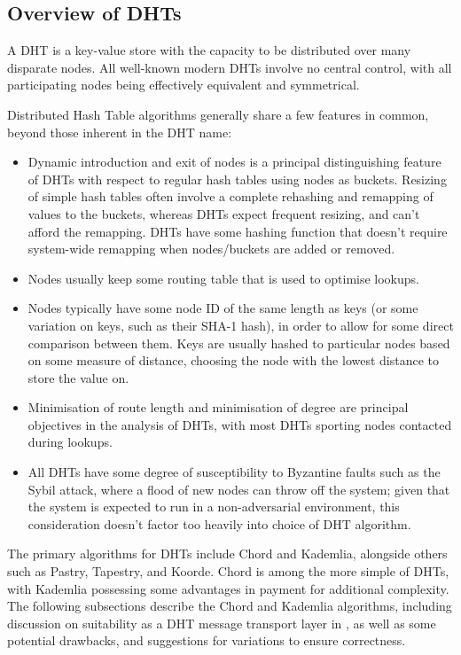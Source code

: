 \subsection{Overview of DHTs}

A DHT is a key-value store with the capacity to be distributed over many disparate nodes\cite{balakrishnan2003p2p}.
All well-known modern DHTs involve no central control, with all participating nodes being effectively equivalent and symmetrical.

Distributed Hash Table algorithms generally share a few features in common, beyond those inherent in the DHT name: \begin{itemize} \item Dynamic introduction and exit of nodes is a principal distinguishing feature of DHTs with respect to regular hash tables using nodes as buckets.
	      Resizing of simple hash tables often involve a complete rehashing and remapping of values to the buckets, whereas DHTs expect frequent resizing, and can't afford the remapping.
	      DHTs have some hashing function that doesn't require system-wide remapping when nodes/buckets are added or removed\cite{thaler1996rendezvous}.
	\item Nodes usually keep some routing table that is used to optimise lookups\cite{galuba2009p2p}.
	\item Nodes typically have some node ID of the same length as keys (or some variation on keys, such as their SHA-1 hash), in order to allow for some direct comparison between them.
	      Keys are usually hashed to particular nodes based on some measure of distance, choosing the node with the lowest distance to store the value on.
	\item Minimisation of route length and minimisation of degree are principal objectives in the analysis of DHTs, with most DHTs sporting  nodes contacted during lookups.
	\item All DHTs have some degree of susceptibility to Byzantine faults such as the Sybil attack, where a flood of new nodes can throw off the system; given that the \lsr{} system is expected to run in a non-adversarial environment, this consideration doesn't factor too heavily into choice of DHT algorithm\cite{douceur2002sybil}\cite{urdaneta2011dhtsec}.
\end{itemize}

The primary algorithms for DHTs include Chord and Kademlia, alongside others such as Pastry, Tapestry, and Koorde.
Chord is among the more simple of DHTs, with Kademlia possessing some advantages in payment for additional complexity.
The following subsections describe the Chord and Kademlia algorithms, including discussion on suitability as a DHT message transport layer in \lsr{}, as well as some potential drawbacks, and suggestions for variations to ensure correctness.

